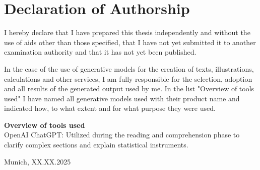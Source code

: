 \section*{Declaration of Authorship}

I hereby declare that I have prepared this thesis independently and without the use of aids other than those specified, that I have not yet submitted it to another examination authority and that it has not
yet been published.

\noindent In the case of the use of generative models for the creation of texts, illustrations, calculations and other services, I am fully responsible for the selection, adoption and all results of the generated output used by me. In the list "Overview of tools used" I have named all generative models used with their product name and indicated how, to what extent and for what purpose they were used.

\vspace{\baselineskip}

\noindent\textbf{Overview of tools used}\\
OpenAI ChatGPT: Utilized during the reading and comprehension phase to clarify complex sections and explain statistical instruments.

\vspace{\baselineskip}

\begin{multicols}{2}
\noindent Munich, XX.XX.2025

\columnbreak

\end{multicols}